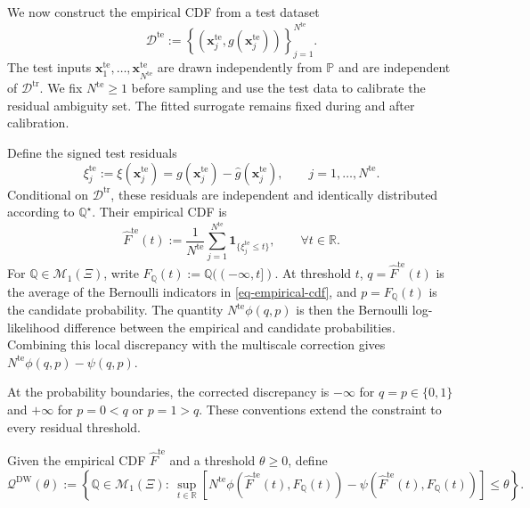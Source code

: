\documentclass[review,11pt,3p,authoryear,nopreprintline]{elsarticle}
\begin{document}
We now construct the empirical CDF from a test dataset
\[
  \mathcal D^{\mathrm{te}}:=\left\{\left(\bm x_j^{\mathrm{te}},g(\bm x_j^{\mathrm{te}})\right)\right\}_{j=1}^{N^{\mathrm{te}}}.
\]
The test inputs $\bm x_1^{\mathrm{te}},\ldots,\bm x_{N^{\mathrm{te}}}^{\mathrm{te}}$ are drawn independently from $\mathbb P$ and are independent of $\mathcal D^{\mathrm{tr}}$. We fix $N^{\mathrm{te}}\ge1$ before sampling and use the test data to calibrate the residual ambiguity set. The fitted surrogate remains fixed during and after calibration.

Define the signed test residuals
\[
  \xi_j^{\mathrm{te}}:=\xi(\bm x_j^{\mathrm{te}})=g(\bm x_j^{\mathrm{te}})-\hat g(\bm x_j^{\mathrm{te}}),\qquad j=1,\ldots,N^{\mathrm{te}}.
\]
Conditional on $\mathcal D^{\mathrm{tr}}$, these residuals are independent and identically distributed according to $\mathbb Q^\star$. Their empirical CDF is
\begin{equation}
  \widehat F^{\mathrm{te}}(t):=\frac{1}{N^{\mathrm{te}}}\sum_{j=1}^{N^{\mathrm{te}}}\mathbf 1_{\{\xi_j^{\mathrm{te}}\le t\}},\qquad \forall t\in\mathbb R.
  \label{eq-empirical-cdf}
\end{equation}
For $\mathbb Q\in\mathcal M_1(\Xi)$, write $F_{\mathbb Q}(t):=\mathbb Q(({-\infty},t])$. At threshold $t$, $q=\widehat F^{\mathrm{te}}(t)$ is the average of the Bernoulli indicators in \eqref{eq-empirical-cdf}, and $p=F_{\mathbb Q}(t)$ is the candidate probability. The quantity $N^{\mathrm{te}}\phi(q,p)$ is then the Bernoulli log-likelihood difference between the empirical and candidate probabilities. Combining this local discrepancy with the multiscale correction gives $N^{\mathrm{te}}\phi(q,p)-\psi(q,p)$.

At the probability boundaries, the corrected discrepancy is $-\infty$ for $q=p\in\{0,1\}$ and $+\infty$ for $p=0<q$ or $p=1>q$. These conventions extend the constraint to every residual threshold.

\begin{definition}
  \label{definition-dw-ambiguity-set}
  Given the empirical CDF $\widehat F^{\mathrm{te}}$ and a threshold $\theta\ge0$, define
  \begin{equation} 
    \label{eq-cdf-ambiguity-set}
      \mathcal Q^{\mathrm{DW}}(\theta):=\left\{\mathbb Q\in\mathcal M_1(\Xi):\ 
      \sup_{t\in\mathbb R}\left[ N^{\mathrm{te}}\phi\!\left(\widehat F^{\mathrm{te}}(t),F_{\mathbb Q}(t)\right) 
       {}-\psi\!\left(\widehat F^{\mathrm{te}}(t),F_{\mathbb Q}(t)\right)\right]\le\theta\right\}. 
  \end{equation} 
\end{definition}
\end{document}
